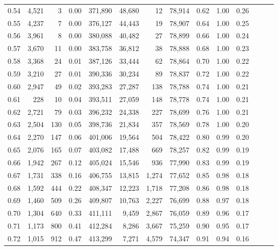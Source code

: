\begin{tabular}{rrrrrrrrrrrrrr}
0.54 &  4,521 &      3 &  0.00 &  371,890 &   48,680 &      12 &  78,914 &  0.62 &  1.00 &      0.26 \\
0.55 &  4,237 &      7 &  0.00 &  376,127 &   44,443 &      19 &  78,907 &  0.64 &  1.00 &      0.25 \\
0.56 &  3,961 &      8 &  0.00 &  380,088 &   40,482 &      27 &  78,899 &  0.66 &  1.00 &      0.24 \\
0.57 &  3,670 &     11 &  0.00 &  383,758 &   36,812 &      38 &  78,888 &  0.68 &  1.00 &      0.23 \\
0.58 &  3,368 &     24 &  0.01 &  387,126 &   33,444 &      62 &  78,864 &  0.70 &  1.00 &      0.22 \\
0.59 &  3,210 &     27 &  0.01 &  390,336 &   30,234 &      89 &  78,837 &  0.72 &  1.00 &      0.22 \\
0.60 &  2,947 &     49 &  0.02 &  393,283 &   27,287 &     138 &  78,788 &  0.74 &  1.00 &      0.21 \\
0.61 &    228 &     10 &  0.04 &  393,511 &   27,059 &     148 &  78,778 &  0.74 &  1.00 &      0.21 \\
0.62 &  2,721 &     79 &  0.03 &  396,232 &   24,338 &     227 &  78,699 &  0.76 &  1.00 &      0.21 \\
0.63 &  2,504 &    130 &  0.05 &  398,736 &   21,834 &     357 &  78,569 &  0.78 &  1.00 &      0.20 \\
0.64 &  2,270 &    147 &  0.06 &  401,006 &   19,564 &     504 &  78,422 &  0.80 &  0.99 &      0.20 \\
0.65 &  2,076 &    165 &  0.07 &  403,082 &   17,488 &     669 &  78,257 &  0.82 &  0.99 &      0.19 \\
0.66 &  1,942 &    267 &  0.12 &  405,024 &   15,546 &     936 &  77,990 &  0.83 &  0.99 &      0.19 \\
0.67 &  1,731 &    338 &  0.16 &  406,755 &   13,815 &   1,274 &  77,652 &  0.85 &  0.98 &      0.18 \\
0.68 &  1,592 &    444 &  0.22 &  408,347 &   12,223 &   1,718 &  77,208 &  0.86 &  0.98 &      0.18 \\
0.69 &  1,460 &    509 &  0.26 &  409,807 &   10,763 &   2,227 &  76,699 &  0.88 &  0.97 &      0.18 \\
0.70 &  1,304 &    640 &  0.33 &  411,111 &    9,459 &   2,867 &  76,059 &  0.89 &  0.96 &      0.17 \\
0.71 &  1,173 &    800 &  0.41 &  412,284 &    8,286 &   3,667 &  75,259 &  0.90 &  0.95 &      0.17 \\
0.72 &  1,015 &    912 &  0.47 &  413,299 &    7,271 &   4,579 &  74,347 &  0.91 &  0.94 &      0.16 \\

\end{tabular}
